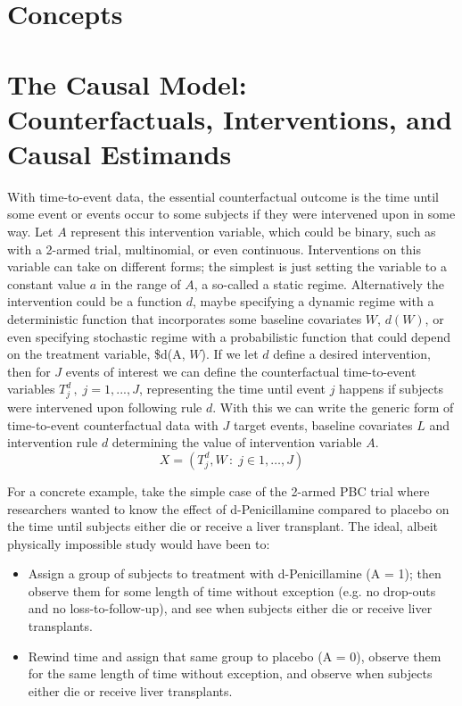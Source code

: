 \documentclass{report}
\newcommand{\1}{\ensuremath{\mathbf{1}}}
\renewcommand{\L}{\ensuremath{W}}
\begin{document}
\section{Concepts}
\label{sec:org04419a4}
\section{The Causal Model: Counterfactuals, Interventions, and Causal Estimands}
With time-to-event data, the essential counterfactual outcome is the time until some event or events occur to some subjects if they were intervened upon in some way. Let \(A\) represent this intervention variable, which could be binary, such as with a 2-armed trial, multinomial, or even continuous. Interventions on this variable can take on different forms; the simplest is just setting the variable to a constant value \(a\) in the range of \(A\), a so-called a static regime. Alternatively the intervention could be a function \(d\), maybe specifying a dynamic regime with a deterministic function that incorporates some baseline covariates \(\L\), \(d(\L)\), or even specifying stochastic regime with a probabilistic function that could depend on the treatment variable, \$d(A, \L). If we let \(d\) define a desired intervention, then for \(J\) events of interest we can define the counterfactual time-to-event variables \(T^d_j \,,\; j = 1, ..., J\), representing the time until event \(j\) happens if subjects were intervened upon following rule \(d\). With this we can write the generic form of time-to-event counterfactual data with \(J\) target events, baseline covariates \(L\) and intervention rule \(d\) determining the value of intervention variable \(A\).
\[ X = \left( T^d_j, \L \,:\; j \in 1, \dots, J \right)\]

For a concrete example, take the simple case of the 2-armed PBC trial where researchers wanted to know the effect of d-Penicillamine compared to placebo on the time until subjects either die or receive a liver transplant. The ideal, albeit physically impossible study would have been to:
\begin{itemize}
\item Assign a group of subjects to treatment with d-Penicillamine (A = 1); then observe them for some length of time without exception (e.g. no drop-outs and no loss-to-follow-up), and see when subjects either die or receive liver transplants.
\item Rewind time and assign that same group to placebo (A = 0), observe them for the same length of time without exception, and observe when subjects either die or receive liver transplants.
\end{itemize}
\end{document}
